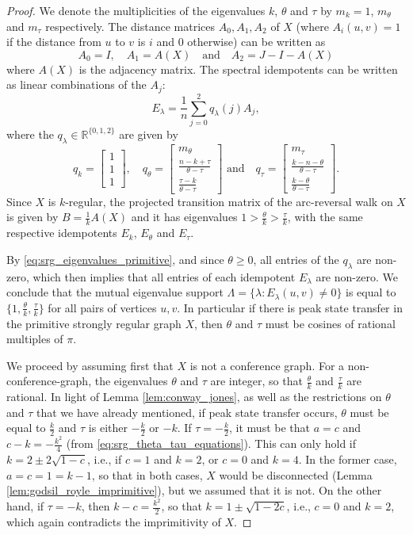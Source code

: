\documentclass{article}
\numberwithin{equation}{section}
\newcommand\re{{\mathbb R}}%
\begin{document}
\begin{proof}
We denote the multiplicities of the eigenvalues $k$, $\theta$ and $\tau$ by $m_k = 1$, $m_\theta$ and $m_\tau$ respectively. The distance matrices $A_0,A_1,A_2$ of $X$ (where $A_i(u,v) = 1$ if the distance from $u$ to $v$ is $i$ and $0$ otherwise) can be written as 
\[
A_0 = I, \quad A_1 = A(X) \quad \text{and} \quad A_2 = J - I - A(X)
\]
where $A(X)$ is the adjacency matrix. The spectral idempotents can be written as linear combinations of the $A_j$:
\[
E_\lambda = \frac{1}{n}\sum_{j=0}^2 q_\lambda(j) A_j,
\]
where the $q_\lambda \in \re^{\{0,1,2\}}$ are given by
\[
q_k = \begin{bmatrix}
1 \\ 1 \\ 1
\end{bmatrix}, \quad q_\theta = \begin{bmatrix}
m_\theta \\ \frac{n-k+\tau}{\theta-\tau} \\ \frac{\tau-k}{\theta-\tau}
\end{bmatrix}
\text{ and} \quad q_{\tau} = 
\begin{bmatrix}
m_\tau \\ \frac{k-n-\theta}{\theta-\tau} \\ \frac{k-\theta}{\theta-\tau}
\end{bmatrix}.
\]
Since $X$ is $k$-regular, the projected transition matrix of the arc-reversal walk on $X$ is given by $B = \frac{1}{k}A(X)$ and it has eigenvalues $1 > \frac{\theta}{k} > \frac{\tau}{k}$, with the same respective idempotents $E_k$, $E_\theta$ and $E_\tau$.

By \eqref{eq:srg_eigenvalues_primitive}, and since $\theta \geq 0$, all entries of the $q_\lambda$ are non-zero, which then implies that all entries of each idempotent $E_\lambda$ are non-zero. We conclude that the mutual eigenvalue support
$\Lambda = \{\lambda : E_\lambda(u,v) \neq 0\}$ is equal to $\{1,\frac{\theta}{k},\frac{\tau}{k}\}$ for all pairs of vertices $u,v$. In particular if there is peak state transfer in the primitive strongly regular graph $X$, then $\theta$ and $\tau$ must be cosines of rational multiples of $\pi$.

We proceed by assuming first that $X$ is not a conference graph. For a non-conference-graph, the eigenvalues $\theta$ and $\tau$ are integer, so that $\frac{\theta}{k}$ and $\frac{\tau}{k}$ are rational. In light of Lemma \ref{lem:conway_jones}, as well as the restrictions on $\theta$ and $\tau$ that we have already mentioned, if peak state transfer occurs, $\theta$ must be equal to $\frac{k}{2}$ and $\tau$ is either $-\frac{k}{2}$ or $-k$. If $\tau = -\frac{k}{2}$, it must be that $a = c$ and $c-k = -\frac{k^2}{4}$ (from \eqref{eq:srg_theta_tau_equations}). This can only hold if $k = 2 \pm 2\sqrt{1-c}$, i.e., if $c = 1$ and $k = 2$, or $c=0$ and $k=4$. In the former case, $a = c = 1 = k-1$, so that in both cases, $X$ would be disconnected (Lemma \ref{lem:godsil_royle_imprimitive}), but we assumed that it is not. On the other hand, if $\tau = -k$, then $k - c = \frac{k^2}{2}$, so that $k = 1 \pm \sqrt{1 - 2c}$, i.e., $c = 0$ and $k=2$, which again contradicts the imprimitivity of $X$.


\end{proof}
\end{document}
